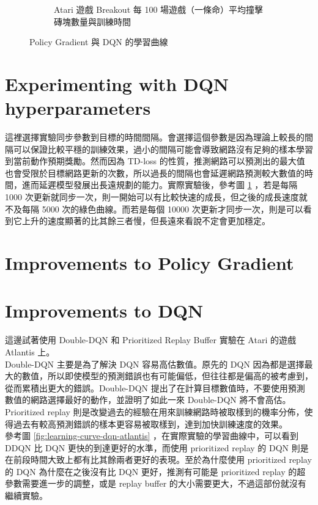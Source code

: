 \documentclass[fleqn,a4paper,12pt]{article}
\begin{document}
\begin{figure}[h]
\begin{subfigure}{.45\textwidth}
  \caption{Atari 遊戲 Breakout 每 100 場遊戲（一條命）平均撞擊磚塊數量與訓練時間}
  \label{fig:learning-curve-dqn}
\end{subfigure}
\label{fig:learning-curve}
\caption{Policy Gradient 與 DQN 的學習曲線}
\end{figure}


\section{Experimenting with DQN hyperparameters}

這裡選擇實驗同步參數到目標的時間間隔。會選擇這個參數是因為理論上較長的間隔可以保證比較平穩的訓練效果，過小的間隔可能會導致網路沒有足夠的樣本學習到當前動作預期獎勵。然而因為 TD-loss 的性質，推測網路可以預測出的最大值也會受限於目標網路更新的次數，所以過長的間隔也會延遲網路預測較大數值的時間，進而延遲模型發展出長遠規劃的能力。實際實驗後，參考圖 \ref{fig:learning-curve-dqn} ，若是每隔 1000 次更新就同步一次，則一開始可以有比較快速的成長，但之後的成長速度就不及每隔 5000 次的綠色曲線。而若是每個 10000 次更新才同步一次，則是可以看到它上升的速度顯著的比其餘三者慢，但長遠來看說不定會更加穩定。

\section{Improvements to Policy Gradient}

\section{Improvements to DQN}

這邊試著使用 Double-DQN 和 Prioritized Replay Buffer 實驗在 Atari 的遊戲 Atlantis 上。\\

Double-DQN 主要是為了解決 DQN 容易高估數值。原先的 DQN 因為都是選擇最大的數值，所以即使模型的預測錯誤也有可能偏低，但往往都是偏高的被考慮到，從而累積出更大的錯誤。Double-DQN 提出了在計算目標數值時，不要使用預測數值的網路選擇最好的動作，並證明了如此一來 Double-DQN 將不會高估。\\

Prioritized replay 則是改變過去的經驗在用來訓練網路時被取樣到的機率分佈，使得過去有較高預測錯誤的樣本更容易被取樣到，達到加快訓練速度的效果。\\

參考圖 \ref{fig:learning-curve-dqn-atlantis} ，在實際實驗的學習曲線中，可以看到 DDQN 比 DQN 更快的到達更好的水準，而使用 prioritized replay 的 DQN 則是在前段時間大致上都有比其餘兩者更好的表現。至於為什麼使用 prioritized replay 的 DQN 為什麼在之後沒有比 DQN 更好，推測有可能是 prioritized replay 的超參數需要進一步的調整，或是 replay buffer 的大小需要更大，不過這部份就沒有繼續實驗。
\end{document}
